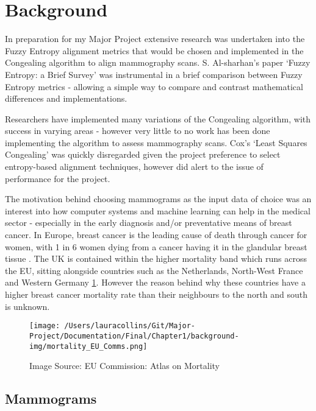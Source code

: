 \section{Background}
In preparation for my Major Project extensive research was undertaken into the Fuzzy Entropy alignment metrics that would be chosen and implemented in the Congealing algorithm to align mammography scans. S. Al-sharhan's paper `Fuzzy Entropy: a Brief Survey' \cite{Al-Sharhan_Karray_Gueaieb_Basir_2001} was instrumental in a brief comparison between Fuzzy Entropy metrics - allowing a simple way to compare and contrast mathematical differences and implementations.

Researchers have implemented many variations of the Congealing algorithm, with success in varying areas - however very little to no work has been done implementing the algorithm to assess mammography scans. Cox's `Least Squares Congealing' \cite{Cox_Sridharan_Lucey_Cohn_2008} was quickly disregarded given the project preference to select entropy-based alignment techniques, however did alert to the issue of performance for the project.

The motivation behind choosing mammograms as the input data of choice was an interest into how computer systems and machine learning can help in the medical sector - especially in the early diagnosis and/or preventative means of breast cancer. In Europe, breast cancer is the leading cause of death through cancer for women, with 1 in 6 women dying from a cancer having it in the glandular breast tissue \cite{European Commission_2009}. The UK is contained within the higher mortality band which runs across the EU, sitting alongside countries such as the Netherlands, North-West France and Western Germany \ref{fig:mortality-band}. However the reason behind why these countries have a higher breast cancer mortality rate than their neighbours to the north and south is unknown.

\begin{figure}[!ht]
  \center
  \texttt{[image: /Users/lauracollins/Git/Major-Project/Documentation/Final/Chapter1/background-img/mortality\_EU\_Comms.png]}
  \caption{Image Source: EU Commission: Atlas on Mortality \cite{European_Commission_2009}}
  \label{fig:mortality-band}
\end{figure}

\subsection{Mammograms}

